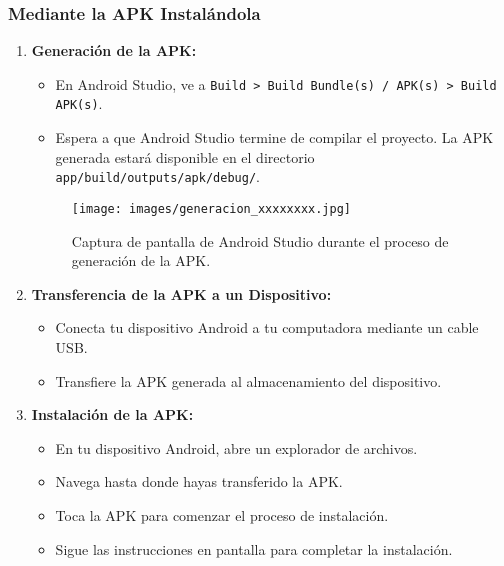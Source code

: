 \documentclass{article}
\begin{document}
    \subsubsection{Mediante la APK Instalándola}

    \begin{enumerate}
        \item \textbf{Generación de la APK:}
            \begin{itemize}
                \item En Android Studio, ve a \texttt{Build > Build Bundle(s) / APK(s) > Build APK(s)}.
                \item Espera a que Android Studio termine de compilar el proyecto. La APK generada estará disponible en el directorio \texttt{app/build/outputs/apk/debug/}.
            \end{itemize}

            \begin{figure}[h]
                \centering
                \texttt{[image: images/generacion\_xxxxxxxx.jpg]}
                \caption{Captura de pantalla de Android Studio durante el proceso de generación de la APK.}
                \label{fig:generacion_apk}
            \end{figure}

        \item \textbf{Transferencia de la APK a un Dispositivo:}
            \begin{itemize}
                \item Conecta tu dispositivo Android a tu computadora mediante un cable USB.
                \item Transfiere la APK generada al almacenamiento del dispositivo.
            \end{itemize}

        \item \textbf{Instalación de la APK:}
            \begin{itemize}
                \item En tu dispositivo Android, abre un explorador de archivos.
                \item Navega hasta donde hayas transferido la APK.
                \item Toca la APK para comenzar el proceso de instalación.
                \item Sigue las instrucciones en pantalla para completar la instalación.
            \end{itemize}


\end{enumerate}
\end{document}
